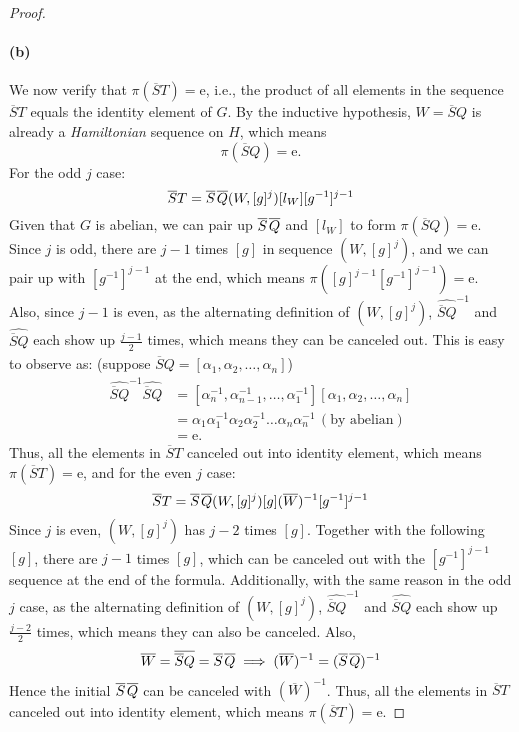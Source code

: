 \documentclass{article}
\begin{document}
\begin{proof}
\paragraph{(b)} We now verify that \( \pi(\overline{S}T) = \text{e} \), i.e., the product of all elements in the sequence \( \overline{S}T \) equals the identity element of \( G \). By the inductive hypothesis, \( W = \overline{S}Q \) is already a \textit{Hamiltonian} sequence on \( H \), which means
\[
\pi(\overline{S}Q) = \text{e}.
\]
For the odd $j$ case:
\[
\overline{S}T = \overline{S}\mkern2mu\overline{Q}(W, [g]^j)[l_W][g^{-1}]^{j-1}
\]
Given that $G$ is abelian, we can pair up $\overline{S}\mkern2mu\overline{Q}$ and $[l_W]$ to form $\pi(\overline{S}Q)= \text{e}$. Since $j$ is odd, there are $j-1$ times $[g]$ in sequence $(W, [g]^j)$, and we can pair up with $[g^{-1}]^{j-1}$ at the end, which means $\pi([g]^{j-1}[g^{-1}]^{j-1}) = \text{e}$. Also, since $j-1$ is even, as the alternating definition of $(W, [g]^j)$, $\widehat{\overline{S}Q}^{-1}$ and $\widehat{\overline{S}Q}$ each show up $\frac{j-1}{2}$ times, which means they can be canceled out. This is easy to observe as: (suppose $\widehat{\overline{S}Q} = [\alpha_1, \alpha_2, \dots, \alpha_n]$)
\begin{align*}
\widehat{\overline{S}Q}^{-1} \widehat{\overline{S}Q} &= [\alpha_n^{-1}, \alpha_{n-1}^{-1}, \dots, \alpha_1^{-1}] [\alpha_1, \alpha_2, \dots, \alpha_n] \\
                  &= \alpha_1 \alpha_1^{-1} \alpha_2 \alpha_2^{-1} \dots \alpha_n \alpha_n^{-1} \, (\text{by abelian}) \\
                  &= \text{e}.
\end{align*}
Thus, all the elements in $\overline{S}T$ canceled out into identity element, which means $\pi(\overline{S}T)= \text{e}$, and for the even $j$ case:
\[
\overline{S}T = \overline{S}\mkern2mu\overline{Q}(W, [g]^j)[g](\overline{W})^{-1}[g^{-1}]^{j-1}
\]
Since $j$ is even, $(W, [g]^j)$ has $j-2$ times $[g]$. Together with the following $[g]$, there are $j-1$ times $[g]$, which can be canceled out with the $[g^{-1}]^{j-1}$ sequence at the end of the formula. 
Additionally, with the same reason in the odd $j$ case, as the alternating definition of $(W, [g]^j)$, $\widehat{\overline{S}Q}^{-1}$ and $\widehat{\overline{S}Q}$ each show up $\frac{j-2}{2}$ times, which means they can also be canceled. 
Also,\[
\overline{W} = \overline{\overline{S}Q} = \overline{S}\mkern2mu\overline{Q} \implies (\overline{W})^{-1} = (\overline{S}\mkern2mu\overline{Q})^{-1}
\]
Hence the initial $\overline{S}\mkern2mu\overline{Q}$ can be canceled with $(\overline{W})^{-1}$. 
Thus, all the elements in $\overline{S}T$ canceled out into identity element, which means $\pi(\overline{S}T)= \text{e}$.


\end{proof}
\end{document}
